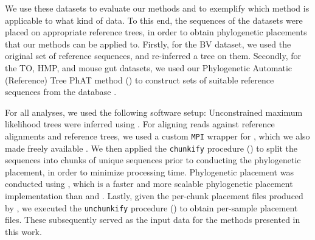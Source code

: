 We use these datasets to evaluate our methods and to exemplify which method is applicable to what kind of data.
To this end, the sequences of the datasets were placed on appropriate reference trees,
in order to obtain phylogenetic placements that our methods can be applied to.
Firstly, for the \ac{BV} dataset, we used the original set of reference sequences, and re-inferred a tree on them.
Secondly, for the \ac{TO}, \ac{HMP}, and mouse gut datasets,
we used our Phylogenetic Automatic (Reference) Tree \ac{PhAT} method ()
to construct sets of suitable reference sequences from the  database \cite{Quast2013,Yilmaz2014}.

For all analyses, we used the following software setup:
Unconstrained maximum likelihood trees were inferred using  \cite{Stamatakis2014}.
For aligning reads against reference alignments and reference trees,
we used a custom \texttt{\acs{MPI}} wrapper for  \cite{Berger2011a,Berger2012},
which we also made freely available \cite{PaPaRaMPI}.
We then applied the \texttt{chunkify} procedure ()
to split the sequences into chunks of unique sequences prior to conducting the phylogenetic placement,
in order to minimize processing time.
Phylogenetic placement was conducted using  \cite{Barbera2018},
which is a faster and more scalable phylogenetic placement implementation
than  \cite{Berger2011} and  \cite{Matsen2010}.
Lastly, given the per-chunk placement files produced by , we executed the \texttt{unchunkify} procedure
() to obtain per-sample placement files.
These subsequently served as the input data for the methods presented in this work.



